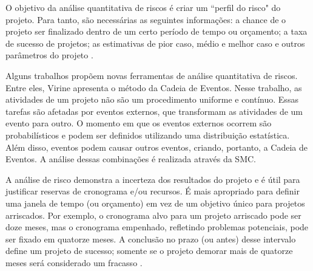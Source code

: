 O objetivo da análise quantitativa de riscos é criar um ``perfil do risco" do projeto. Para tanto, são necessárias as seguintes informações: a chance de o projeto ser finalizado dentro de um certo período de tempo ou orçamento; a taxa de sucesso de projetos; as estimativas de pior caso, médio e melhor caso e outros parâmetros do projeto \cite{PMBOK2008}.

Alguns trabalhos propõem novas ferramentas de análise quantitativa de riscos. Entre eles, Virine \cite{VIRINE2009} apresenta o método da Cadeia de Eventos. Nesse trabalho, as atividades de um projeto não são um procedimento uniforme e contínuo. Essas tarefas são afetadas por eventos externos, que transformam as atividades de um evento para outro. O momento em que os eventos externos ocorrem são probabilísticos e podem ser definidos utilizando uma distribuição estatística. Além disso, eventos podem causar outros eventos, criando, portanto, a Cadeia de Eventos. A análise dessas combinações é realizada através da SMC.

A análise de risco demonstra a incerteza dos resultados do projeto e é útil para justificar reservas de cronograma e/ou recursos. É mais apropriado para definir uma janela de tempo (ou orçamento) em vez de um objetivo único para projetos arriscados. Por exemplo, o cronograma alvo para um projeto arriscado pode ser doze meses, mas o cronograma empenhado, refletindo problemas potenciais, pode ser fixado em quatorze meses. A conclusão no prazo (ou antes) desse intervalo define um projeto de sucesso; somente se o projeto demorar mais de quatorze meses será considerado um fracasso \cite{kendrick2003identifying}.

